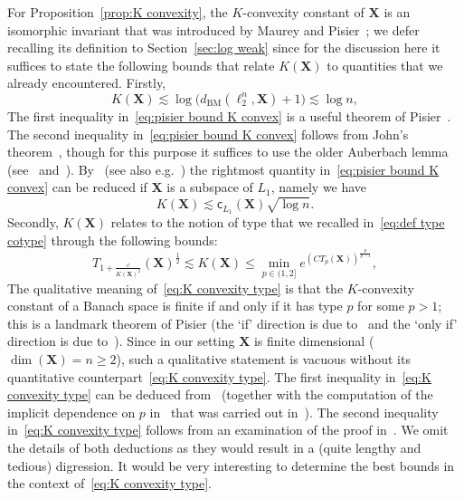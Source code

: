 \documentclass[11pt,reqno]{amsart}
\renewcommand{\le}{\leqslant}
\renewcommand{\ge}{\geqslant}
\newcommand{\cc}{\mathsf{c}}
\newcommand{\X}{\mathbf X}
\theoremstyle{remark}
\newcommand{\BM}{\mathrm{BM}}
\renewcommand{\1}{\mathbf 1}
\begin{document}
For Proposition~\ref{prop:K convexity}, the $K$-convexity constant of $\X$ is an isomorphic invariant that was introduced by Maurey and Pisier~\cite{MP76}; we defer recalling its definition to Section~\ref{sec:log weak} since for the discussion here it suffices to state the following bounds that relate $K(\X)$ to quantities that we already encountered. Firstly,
\begin{equation}\label{eq:pisier bound K convex}
K(\X)\lesssim \log \big(d_{\BM}(\ell_2^n,\X)+1\big)\lesssim \log n,
\end{equation}
The first inequality in~\eqref{eq:pisier bound K convex} is a useful theorem of Pisier~\cite{Pis80-K,Pis80}. The second inequality in~\eqref{eq:pisier bound K convex} follows from John's theorem~\cite{Joh48}, though  for this purpose it suffices to use the older Auberbach lemma (see~\cite[page~209]{Ban32} and~\cite{day47,Tay47}). By~\cite{Pis80} (see also e.g.~\cite[Lemma~17]{JS01}) the rightmost quantity in~\eqref{eq:pisier bound K convex} can be reduced if $\X$ is a subspace of $L_1$, namely we have
\begin{equation}\label{eq:sqrt log L1}
K(\X)\lesssim \cc_{L_1}(\X)\sqrt{\log n}.
\end{equation}
Secondly, $K(\X)$ relates to the notion of type that we recalled  in~\eqref{eq:def type cotype} through the following bounds:
\begin{equation}\label{eq:K convexity type}
T_{1+\frac{c}{K(\X)^2}}(\X)^{\frac12}\lesssim K(\X)\le \min_{p\in (1,2]}e^{( C T_p(\X))^{\frac{p}{p-1}}},
\end{equation}
The qualitative meaning of~\eqref{eq:K convexity type} is that the $K$-convexity constant of a Banach space is finite if and only if it has type $p$ for some $p>1$; this is a landmark theorem of Pisier (the `if' direction is due to~\cite{Pis82} and the `only if' direction is due to~\cite{Pis73}).  Since in our setting $\X$ is finite dimensional ($\dim(\X)=n\ge 2$), such a qualitative statement is vacuous without its quantitative counterpart~\eqref{eq:K convexity type}. The first inequality in~\eqref{eq:K convexity type}  can be deduced from~\cite{Pis83} (together with the computation of the implicit dependence on $p$ in~\cite{Pis83} that was carried out in~\cite[Lemma~32]{HLN16}). The second inequality in~\eqref{eq:K convexity type} follows from an examination of the proof in~\cite{Pis82}. We omit the details of both deductions as they would result in a (quite lengthy and tedious) digression. It would be very interesting to determine the best bounds in the context of~\eqref{eq:K convexity type}.
\end{document}
